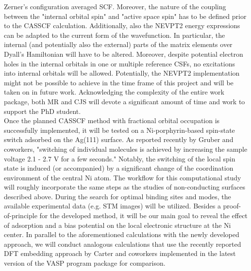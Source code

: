 \documentclass[a4paper,11pt,headings=normal]{scrartcl}
\begin{document}
\begin{itemize}
Zerner's configuration averaged SCF.\autocite{Zerner1989a} Moreover, 
the nature of the coupling between the "internal orbital spin" and "active 
space spin" has to be defined prior to the CASSCF calculation. Additionally, 
also the NEVPT2 energy expressions can be adapted to the current form 
of the wavefunction. In particular, the internal (and potentially also the 
external) parts of the matrix elements over Dyall's Hamiltonian will have to be 
altered. Moreover, despite potential electron holes in the internal orbitals in 
one or multiple reference CSFs, no excitations into internal orbitals will be 
allowed. Potentially, the NEVPT2 implementation might not be possible to 
achieve in the time frame of this project and will be taken on in future work. 
Acknowledging the complexity of the entire work package, both MR and CJS will devote a significant amount 
of time and work to support the PhD student.\\
Once the planned CASSCF method with fractional orbital occupation is successfully 
implemented, it will be 
tested on a Ni-porphyrin-based spin-state switch adsorbed on the Ag(111) 
surface. As reported recently by Gruber and coworkers,\autocite{Gruber2020} 
"switching of individual molecules is achieved by increasing the sample voltage 
2.1 - 2.7 V for a few seconds." Notably, the switching of the local spin state 
is induced (or accompanied) by a significant change of the coordination 
environment of the central Ni atom. The workflow for this computational study 
will roughly incorporate the same steps as the studies of non-conducting 
surfaces described above. During the search for optimal binding sites and 
modes, the available experimental data (e.g. STM images) will be utilized. 
Besides a proof-of-principle for the developed method, it will be our main goal 
to reveal the effect of adsorption and a bias potential on the local electronic 
structure at the Ni center. In parallel to the aforementioned calculations with the 
newly developed approach, we will conduct analogous calculations that use the 
recently reported DFT embedding approach by Carter and 
coworkers\autocite{Carter2024} implemented in the latest version of the VASP 
program package for comparison.\\




\end{itemize}
\end{document}
